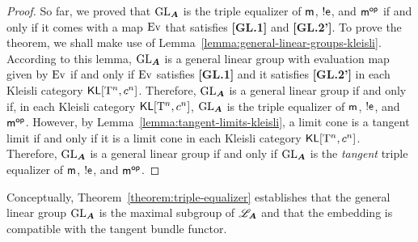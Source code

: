 \begin{proof}
So far, we proved that $\operatorname{GL}_{\bm{A}}$ is the triple equalizer of $\mathsf{m}$, $!\mathsf{e}$, and $\mathsf{m}^{\mathsf{op}}$ if and only if it comes with a map $\operatorname{Ev}$ that satisfies \textbf{[GL.1]} and \textbf{[GL.2']}. To prove the theorem, we shall make use of Lemma~\ref{lemma:general-linear-groups-kleisli}. According to this lemma, $\operatorname{GL}_{\bm{A}}$ is a general linear group with evaluation map given by $\operatorname{Ev}$ if and only if $\operatorname{Ev}$ satisfies \textbf{[GL.1]} and it satisfies \textbf{[GL.2']} in each Kleisli category $\mathsf{KL}[\mathrm{T}^n,c^n]$. Therefore, $\operatorname{GL}_{\bm{A}}$ is a general linear group if and only if, in each Kleisli category $\mathsf{KL}[\mathrm{T}^n,c^n]$, $\operatorname{GL}_{\bm{A}}$ is the triple equalizer of $\mathsf{m}$, $!\mathsf{e}$, and $\mathsf{m}^{\mathsf{op}}$. However, by Lemma~\ref{lemma:tangent-limits-kleisli}, a limit cone is a tangent limit if and only if it is a limit cone in each Kleisli category $\mathsf{KL}[\mathrm{T}^n,c^n]$. Therefore, $\operatorname{GL}_{\bm{A}}$ is a general linear group if and only if $\operatorname{GL}_{\bm{A}}$ is the \emph{tangent} triple equalizer of $\mathsf{m}$, $!\mathsf{e}$, and $\mathsf{m}^{\mathsf{op}}$.
\end{proof}

Conceptually, Theorem~\ref{theorem:triple-equalizer} establishes that the general linear group $\operatorname{GL}_{\bm{A}}$ is the maximal subgroup of $\mathscr{L}_{\bm{A}}$ and that the embedding is compatible with the tangent bundle functor.



